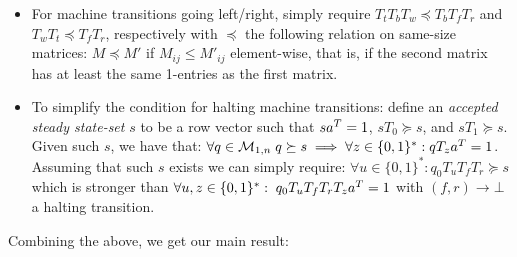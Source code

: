 \begin{itemize}

    \item For machine transitions going left/right, simply require $T_t T_b T_w\preceq T_b T_f T_r$ and $T_w T_t\preceq T_f T_r$, respectively with $\preceq$ the following relation on same-size matrices: $M\preceq M'$ if $M_{ij}\le M'_{ij}$ element-wise, that is, if the second matrix has at least the same 1-entries as the first matrix.

    \item To simplify the condition for halting machine transitions: define an \emph{accepted steady state-set} $s$ to be a row vector such that $sa^T = 1$, $s T_0\succeq s$, and $s T_1\succeq s$. Given such $s$, we have that: $\forall q\in\mathcal{M}_{1,n}\; q \succeq s\implies \forall z\in\{0, 1\}^*: qT_{z}a^T = 1$. Assuming that such $s$ exists we can simply require: $\forall u\in\{0, 1\}^*: q_0T_u T_f T_r \succeq s$ which is stronger than $\forall u,z\in\{0, 1\}^*: \; q_0 T_u T_f T_r T_z a^T = 1$ with $(f,r) \to \bot$ a halting transition.



\end{itemize}

Combining the above, we get our main result:

